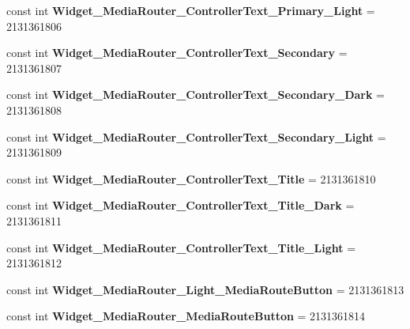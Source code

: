\begin{DoxyCompactItemize}
\mbox{\label{class_pinned_app_1_1_droid_1_1_resource_1_1_style_a0a18270ed558f9f9fb787ff9bb5f393d}} 
const int {\bfseries Widget\+\_\+\+Media\+Router\+\_\+\+Controller\+Text\+\_\+\+Primary\+\_\+\+Light} = 2131361806
\item 
\mbox{\label{class_pinned_app_1_1_droid_1_1_resource_1_1_style_a97abeb994f9354db656a43810627b728}} 
const int {\bfseries Widget\+\_\+\+Media\+Router\+\_\+\+Controller\+Text\+\_\+\+Secondary} = 2131361807
\item 
\mbox{\label{class_pinned_app_1_1_droid_1_1_resource_1_1_style_a45767a8a4ce0bfaa059ea65bc2bb09ee}} 
const int {\bfseries Widget\+\_\+\+Media\+Router\+\_\+\+Controller\+Text\+\_\+\+Secondary\+\_\+\+Dark} = 2131361808
\item 
\mbox{\label{class_pinned_app_1_1_droid_1_1_resource_1_1_style_a258498f67263a12fffa7a7c5e2eca855}} 
const int {\bfseries Widget\+\_\+\+Media\+Router\+\_\+\+Controller\+Text\+\_\+\+Secondary\+\_\+\+Light} = 2131361809
\item 
\mbox{\label{class_pinned_app_1_1_droid_1_1_resource_1_1_style_a821d205c2f204bb66159a56f4c9e243a}} 
const int {\bfseries Widget\+\_\+\+Media\+Router\+\_\+\+Controller\+Text\+\_\+\+Title} = 2131361810
\item 
\mbox{\label{class_pinned_app_1_1_droid_1_1_resource_1_1_style_a225da8abf4ac9c3f9a91c7ebaaa596b9}} 
const int {\bfseries Widget\+\_\+\+Media\+Router\+\_\+\+Controller\+Text\+\_\+\+Title\+\_\+\+Dark} = 2131361811
\item 
\mbox{\label{class_pinned_app_1_1_droid_1_1_resource_1_1_style_a907c9d24ee66c0748e02b70a0b5d040b}} 
const int {\bfseries Widget\+\_\+\+Media\+Router\+\_\+\+Controller\+Text\+\_\+\+Title\+\_\+\+Light} = 2131361812
\item 
\mbox{\label{class_pinned_app_1_1_droid_1_1_resource_1_1_style_ae495de0783d1ee40f740bba6a1e47659}} 
const int {\bfseries Widget\+\_\+\+Media\+Router\+\_\+\+Light\+\_\+\+Media\+Route\+Button} = 2131361813
\item 
\mbox{\label{class_pinned_app_1_1_droid_1_1_resource_1_1_style_aad8e0a1e98be83bac80b53f15371c09f}} 
const int {\bfseries Widget\+\_\+\+Media\+Router\+\_\+\+Media\+Route\+Button} = 2131361814
\end{DoxyCompactItemize}



